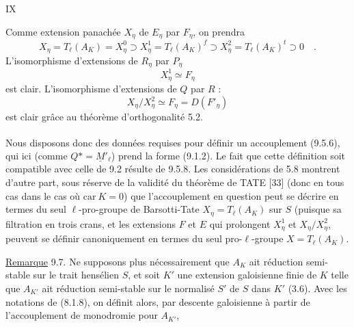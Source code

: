 \hfill IX

Comme extension panachée $X_\eta$ de $E_\eta$ par $F_\eta$, on prendra
\[
X_\eta=T_\ell(A_K)=X_\eta^0\supset X_\eta^1=T_\ell(A_K)^f\supset X_\eta^2=T_\ell(A_K)^t\supset 0\quad . \tag*{(9.6.2)}
\]
L'isomorphisme d'extensions de $R_\eta$ par $P_\eta$
\[
X_\eta^1\simeq F_\eta
\]
est clair. L'isomorphisme d'extensions de $Q$ par $R$ :
\[
X_\eta/X_\eta^2\simeq F_\eta=D(F'_\eta)
\]
est clair grâce au théorème d'orthogonalité 5.2.

Nous disposons donc des données requises pour définir un accouplement (9.5.6)\textsuperscript{}, qui ici (comme $Q*= \underline{M}'_\ell$) prend la forme (9.1.2). Le fait que cette définition soit compatible avec celle de 9.2 résulte de 9.5.8. Les considérations de 5.8 montrent d'autre part, sous réserve de la validité du théorème de TATE [33] (donc en tous cas dans le cas où $\mathrm{car}\ K=0$) que l'accouplement en question peut se décrire en termes du seul $\ell$-pro-groupe de Barsotti-Tate $X_\eta=T_\ell(A_K)$ sur $S$ (puisque sa filtration en trois crans, et les extensions $F$ et $E$ qui prolongent $X_\eta^1$ et $X_\eta/X_\eta^2$, peuvent se définir canoniquement en termes du seul pro-$\ell$-groupe $X=T_\ell(A_K)$.

\uline{Remarque} 9.7. Ne supposons plus nécessairement que $A_K$ ait réduction semi-stable sur le trait hensélien $S$, et soit $K'$ une extension galoisienne finie de $K$ telle que $A_{K'}$ ait réduction semi-stable sur le normalisé $S'$ de $S$ dans $K'$ (3.6). Avec les notations de (8.1.8), on définit alors, par descente galoisienne à partir de l'accouplement de monodromie pour $A_{K'}$,

